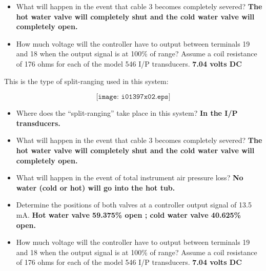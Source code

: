 \begin{itemize}
\item{} What will happen in the event that cable 3 becomes completely severed? {\bf The hot water valve will completely shut and the cold water valve will completely open.}
\vskip 10pt
\item{} How much voltage will the controller have to output between terminals 19 and 18 when the output signal is at 100\% of range?  Assume a coil resistance of 176 ohms for each of the model 546 I/P transducers.  {\bf 7.04 volts DC}
\end{itemize}
 






This is the type of split-ranging used in this system:

$$\texttt{[image: i01397x02.eps]}$$

\begin{itemize}
\item{} Where does the ``split-ranging'' take place in this system? {\bf In the I/P transducers.}
\vskip 10pt
\item{} What will happen in the event that cable 3 becomes completely severed? {\bf The hot water valve will completely shut and the cold water valve will completely open.}
\vskip 10pt
\item{} What will happen in the event of total instrument air pressure loss? {\bf No water (cold or hot) will go into the hot tub.}
\vskip 10pt
\item{} Determine the positions of both valves at a controller output signal of 13.5 mA. {\bf Hot water valve 59.375\% open ; cold water valve 40.625\% open.}
\vskip 10pt
\item{} How much voltage will the controller have to output between terminals 19 and 18 when the output signal is at 100\% of range?  Assume a coil resistance of 176 ohms for each of the model 546 I/P transducers.  {\bf 7.04 volts DC}
\end{itemize}






